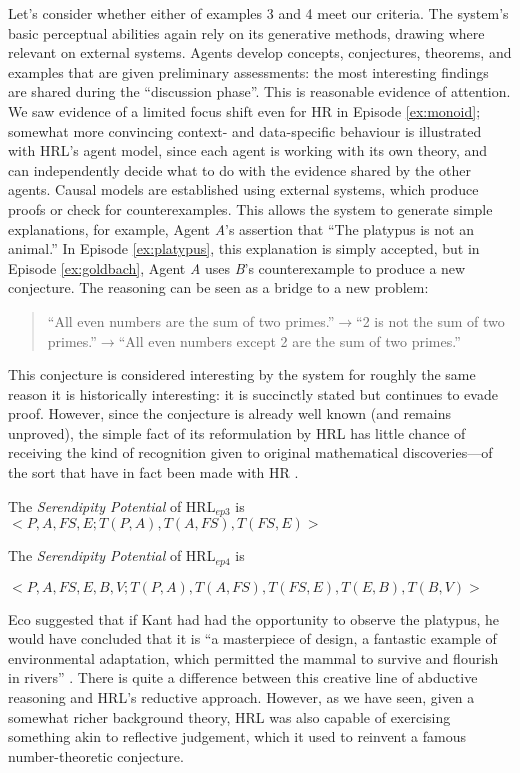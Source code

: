 Let's consider whether either of examples 3 and 4 meet our criteria.
The system's basic perceptual abilities again rely on its generative
methods, drawing where relevant on external systems.  Agents develop
concepts, conjectures, theorems, and examples that are given
preliminary assessments: the most interesting findings are shared
during the ``discussion phase''.  This is reasonable evidence of
attention.  We saw evidence of a limited focus shift even for {\sf HR}
in Episode \ref{ex:monoid}; somewhat more convincing context- and
data-specific behaviour is illustrated with {\sf HRL}'s agent model,
since each agent is working with its own theory, and can independently
decide what to do with the evidence shared by the other agents.
Causal models are established using external systems, which produce
proofs or check for counterexamples.  This allows the system to
generate simple explanations, for example, Agent \emph{A}'s assertion
that ``The platypus is not an animal.''
In Episode \ref{ex:platypus}, this explanation is simply accepted, but
in Episode \ref{ex:goldbach}, Agent \emph{A} uses \emph{B}'s
counterexample to produce a new conjecture.  The reasoning can be seen
as a bridge to a new problem:
\begin{quote}
``All even numbers are the sum of
two primes.''\:$\rightarrow$\:``2 is not the sum of two
primes.''\:$\rightarrow$\:``All even numbers except 2 are the sum of two
primes.'' 
\end{quote}
This conjecture is considered interesting by the system for roughly
the same reason it is historically interesting: it is succinctly
stated but continues to evade proof.  However, since the conjecture
is already well known (and remains unproved), the simple
fact of its reformulation by {\sf HRL} has little chance of 
receiving the kind of recognition given to original mathematical
discoveries---of the sort that have in fact been made with {\sf HR}
\cite{colton2007computational}.

The {\em Serendipity Potential} of HRL$_{ep3}$ is 
$<P, A, FS, E;
T(P, A), T(A, FS), T(FS, E)>$

The {\em Serendipity Potential} of HRL$_{ep4}$ is 

$<P, A, FS, E, B, V;
T(P, A), T(A, FS), T(FS, E), T(E, B), T(B, V)>$

Eco suggested that if Kant had had the opportunity to observe the platypus, he would have concluded that it is ``a masterpiece of design, a fantastic example of environmental adaptation, which permitted the mammal to survive and flourish in rivers'' \cite[p.~93]{eco2000kant}.  There is quite a difference between this creative line of abductive reasoning and {\sf HRL}'s reductive approach.  However, as we have seen, given a somewhat richer background theory, {\sf HRL} was also capable of exercising something akin to reflective judgement, which it used to reinvent a famous number-theoretic conjecture.

